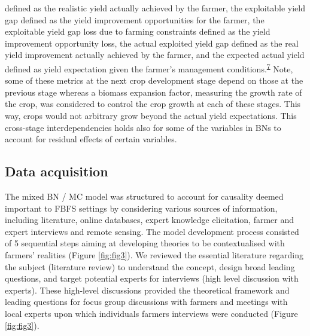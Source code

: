 \documentclass[12pt,oneside]{article}
\begin{document}
defined as the realistic yield actually achieved by the farmer, the exploitable yield gap defined as the yield improvement opportunities for the farmer, the exploitable yield gap loss due to farming constraints defined as the yield improvement opportunity loss, the actual exploited yield gap defined as the real yield improvement actually achieved by the farmer, and the expected actual yield defined as yield expectation given the farmer's management conditions.\textsuperscript{\protect\hyperlink{ref-VanIttersum_et_al_2013}{7}} Note, some of these metrics at the next crop development stage depend on those at the previous stage whereas a biomass expansion factor, measuring the growth rate of the crop, was considered to control the crop growth at each of these stages. This way, crops would not arbitrary grow beyond the actual yield expectations. This cross-stage interdependencies holds also for some of the variables in BNs to account for residual effects of certain variables.

\hypertarget{III2}{%
\subsection{Data acquisition}\label{III2}}

The mixed BN / MC model was structured to account for causality deemed important to FBFS settings by considering various sources of information, including literature, online databases, expert knowledge elicitation, farmer and expert interviews and remote sensing. The model development process consisted of 5 sequential steps aiming at developing theories to be contextualised with farmers' realities (Figure \ref{fig:fig3}). We reviewed the essential literature regarding the subject (literature review) to understand the concept, design broad leading questions, and target potential experts for interviews (high level discussion with experts). These high-level discussions provided the theoretical framework and leading questions for focus group discussions with farmers and meetings with local experts upon which individuals farmers interviews were conducted (Figure \ref{fig:fig3}).
\end{document}
